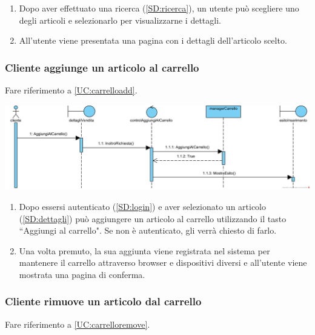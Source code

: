 \documentclass[12pt]{article}
\begin{document}
\begin{enumerate}
\item Dopo aver effettuato una ricerca (\ref{SD:ricerca}), un utente può scegliere uno degli articoli e selezionarlo per visualizzarne i dettagli.
\item All'utente viene presentata una pagina con i dettagli dell'articolo scelto.
\end{enumerate}

\newpage

\subsubsection{Cliente aggiunge un articolo al carrello}
\label{SD:aggiunta}

Fare riferimento a \ref{UC:carrelloadd}. \\

\begin{center}
\includegraphics[width=\textwidth]{SequenceDiagram/ClienteCarrelloAggiunge}
\end{center}

\begin{enumerate}
\item Dopo essersi autenticato (\ref{SD:login}) e aver selezionato un articolo (\ref{SD:dettagli}) può aggiungere un articolo al carrello utilizzando il tasto ``Aggiungi al carrello". Se non è autenticato, gli verrà chiesto di farlo.

\item Una volta premuto, la sua aggiunta viene registrata nel sistema per mantenere il carrello attraverso browser e dispositivi diversi e all'utente viene mostrata una pagina di conferma.
\end{enumerate}

\subsubsection{Cliente rimuove un articolo dal carrello}
\label{SD:rimozione}

Fare riferimento a \ref{UC:carrelloremove}. \\
\end{document}
